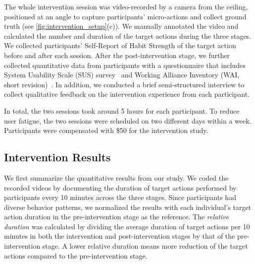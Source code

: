 The whole intervention session was video-recorded by a camera from the ceiling, positioned at an angle to capture participants' micro-actions and collect ground truth (see \autoref{fig:intervention_setup}(c)). We manually annotated the video and calculated the number and duration of the target actions during the three stages.
We collected participants' Self-Report of Habit Strength of the target action~\cite{verplanken2003reflections} before and after each session.
After the post-intervention stage, we further collected quantitative data from participants with a questionnaire that includes System Usability Scale (SUS) survey~\cite{bangor2008empirical} and Working Alliance Inventory (WAI, short revision)~\cite{munder2010working}.
In addition, we conducted a brief semi-structured interview to collect qualitative feedback on the intervention experience from each participant.

In total, the two sessions took around 5 hours for each participant. To reduce user fatigue, the two sessions were scheduled on two different days within a week. Participants were compensated with \$50 for the intervention study.

\subsection{Intervention Results}
\label{sub:intervention_evaluation:intervention_results}
We first summarize the quantitative results from our study.
We coded the recorded videos by documenting the duration of target actions performed by participants every 10 minutes across the three stages.
Since participants had diverse behavior patterns, we normalized the results with each individual's target action duration in the pre-intervention stage as the reference.
The \textit{relative duration} was calculated by dividing the average duration of target actions per 10 minutes in both the intervention and post-intervention stages by that of the pre-intervention stage. A lower relative duration means more reduction of the target actions compared to the pre-intervention stage.



